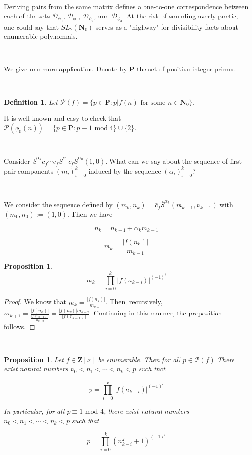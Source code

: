 \documentclass{article}
\newtheorem{definition}[theorem]{Definition}  %
\newtheorem{proposition}[theorem]{Proposition}  %
\begin{document}
\

Deriving pairs from the same matrix defines a one-to-one correspondence between each of the sets $\mathcal{D}_{\phi_0}$, $\mathcal{D}_{\phi_1}$, $\mathcal{D}_{\psi_2}$, and $\mathcal{D}_{\phi_3}$. At the risk of sounding overly poetic, one could say that $SL_2(\mathbf{N}_0)$ serves as a "highway" for divisibility facts about enumerable polynomials.

\

We give one more application. Denote by $\mathbf{P}$ the set of positive integer primes.

\

\begin{definition}
Let $\mathcal{P}(f) = \{ p \in \mathbf{P} : p \lvert f(n) \text{ for some } n \in \mathbf{N}_0 \}$.
\end{definition}

It is well-known and easy to check that $\mathcal{P}(\phi_0(n)) = \{p \in \mathbf{P}: p \equiv 1 \text{ mod } 4 \} \cup \{2 \}$.

\

Consider $\bar{S}^{\alpha_k} \bar{c}_f \cdots \bar{c}_f \bar{S}^{\alpha_1}\bar{c}_f\bar{S}^{\alpha_0}(1,0)$. What can we say about the sequence of first pair components $(m_i)_{i=0}^k$ induced by the sequence $(\alpha_i)_{i=0}^k$?

\

We consider the sequence defined by $(m_{k}, n_{k}) = \bar{c}_f\bar{S}^{\alpha_{k}}(m_{k-1}, n_{k-1})$ with $(m_0, n_0) := (1, 0)$. Then we have

$$n_{k} = n_{k-1} + \alpha_{k} m_{k-1}$$

$$m_{k} = \frac{|f(n_{k})|}{m_{k-1}}$$

\begin{proposition}\label{recursion}
$$m_{k} = \prod_{i=0}^k |f(n_{k-i})|^{(-1)^{i}}$$
\end{proposition}

\begin{proof}
We know that $m_{k} = \frac{|f(n_k)|}{m_{k-1}}$. Then, recursively, $m_{k+1} = \frac{|f(n_k)|}{\frac{|f(n_{k-1})|}{m_{k-2}}} = \frac{|f(n_k)| m_{k-2}}{|f(n_{k-1})|}$. Continuing in this manner, the proposition follows. 
\end{proof}

\

\begin{proposition}
Let $f \in \mathbf{Z}[x]$ be enumerable. Then for all $p \in \mathcal{P}(f)$ There exist natural numbers $n_0 < n_1 < \cdots < n_k < p$ such that

$$p = \prod_{i=0}^k |f(n_{k-i})|^{(-1)^{i}}$$

In particular, for all $p \equiv 1\text{ mod } 4$, there exist natural numbers $n_0 < n_1 < \cdots < n_k < p$ such that

$$p = \prod_{i=0}^k (n_{k-i}^2 + 1)^{(-1)^{i}}$$
\end{proposition}
\end{document}

